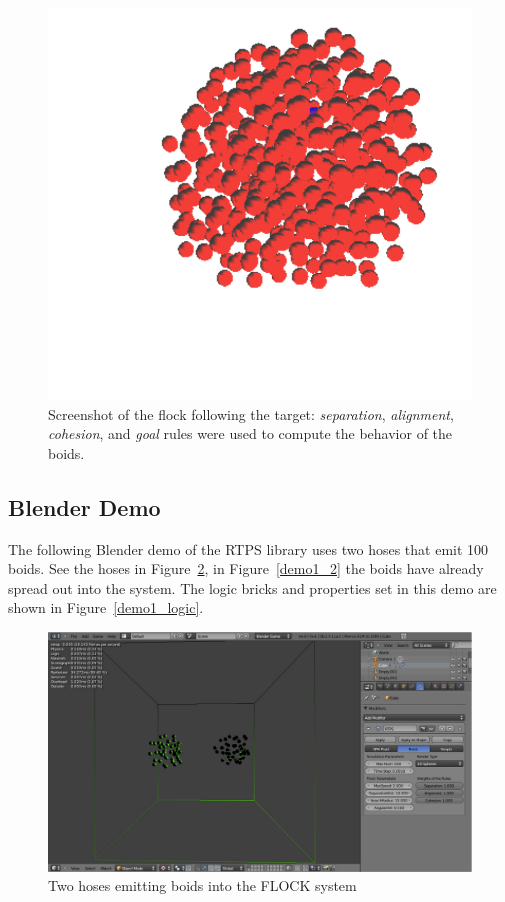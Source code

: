 \begin{figure}[htbp]
\begin{center}
\includegraphics[scale=0.35]{figures/demo_goal_4rules.pdf}
\caption{Screenshot of the flock following the target: \textit{separation}, \textit{alignment}, \textit{cohesion}, and \textit{goal} rules were used to compute the behavior of the boids.}
\label{goal_4rules}
\end{center}
\end{figure}

\subsection{Blender Demo}

The following Blender demo of the RTPS library uses two hoses that emit 100 boids. See the hoses in Figure~\ref{demo1_1}, in Figure~\ref{demo1_2} the boids have already spread out into the system. The logic bricks and properties set in this demo are shown in Figure~\ref{demo1_logic}.

\begin{figure}[htbp]
\begin{center}
\includegraphics[scale=0.32]{figures/demo1_1.pdf}
\caption{Two hoses emitting boids into the FLOCK system}
\label{demo1_1}
\end{center}
\end{figure}

